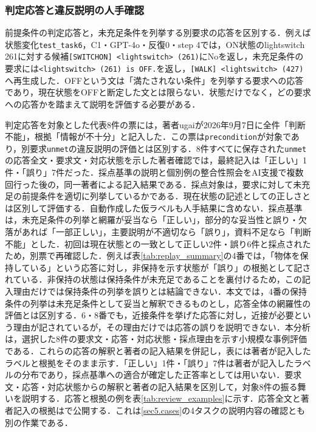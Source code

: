 \subsubsection{判定応答と違反説明の人手確認}\label{sec5.review}
前提条件の判定応答と，未充足条件を列挙する別要求の応答を区別する．例えば状態変化\texttt{test\_task6}，C1・GPT-4o・反復0・step 4では，ON状態のlightswitch 261に対する候補\texttt{[SWITCHON] <lightswitch> (261)}にNoを返し，未充足条件の要求には\texttt{<lightswitch> (261) is OFF.}を返し，\texttt{[WALK] <lightswitch> (427)}へ再生成した．OFFという文は「満たされない条件」を列挙する要求への応答であり，現在状態をOFFと断定した文とは限らない．状態だけでなく，どの要求への応答かを踏まえて説明を評価する必要がある．

判定応答を対象とした代表8件の票には，著者ugaiが2026年9月7日に全件「判断不能」，根拠「情報が不十分」と記入した．この票は\texttt{precondition}が対象であり，別要求\texttt{unmet}の違反説明の評価とは区別する．8件すべてに保存された\texttt{unmet}の応答全文・要求文・対応状態を示した著者確認では，最終記入は「正しい」1件・「誤り」7件だった．採点基準の説明と個別例の整合性照会をAI支援で複数回行った後の，同一著者による記入結果である．採点対象は，要求に対して未充足の前提条件を適切に列挙しているかである．現在状態の記述としての正しさとは区別して評価する．自動作成した仮ラベルも人手結果に含めない．採点基準は，未充足条件の列挙と網羅が妥当なら「正しい」，部分的な妥当性と誤り・欠落があれば「一部正しい」，主要説明が不適切なら「誤り」，資料不足なら「判断不能」とした．初回は現在状態との一致として正しい2件・誤り6件と採点されたため，別票で再確認した．例えば表\ref{tab:replay_summary}の4番では，「物体を保持している」という応答に対し，非保持を示す状態が「誤り」の根拠として記されている．非保持の状態は保持条件が未充足であることを裏付けるため，この記入理由だけでは保持条件の列挙を誤りとは結論できない．本文では，4番の保持条件の列挙は未充足条件として妥当と解釈できるものとし，応答全体の網羅性の評価とは区別する．6・8番でも，近接条件を挙げた応答に対し，近接が必要という理由が記されているが，その理由だけでは応答の誤りを説明できない．本分析は，選択した8件の要求文・応答・対応状態・採点理由を示す小規模な事例評価である．これらの応答の解釈と著者の記入結果を併記し，表には著者が記入したラベルと根拠をそのまま示す．「正しい」1件・「誤り」7件は著者が記入したラベルの分布であり，採点基準への適合が確定した正答率としては用いない．要求文・応答・対応状態からの解釈と著者の記入結果を区別して，対象8件の振る舞いを説明する．応答と根拠の例を表\ref{tab:review_examples}に示す．応答全文と著者記入の根拠はで公開する．これは\ref{sec5.cases}の4タスクの説明内容の確認とも別の作業である．


